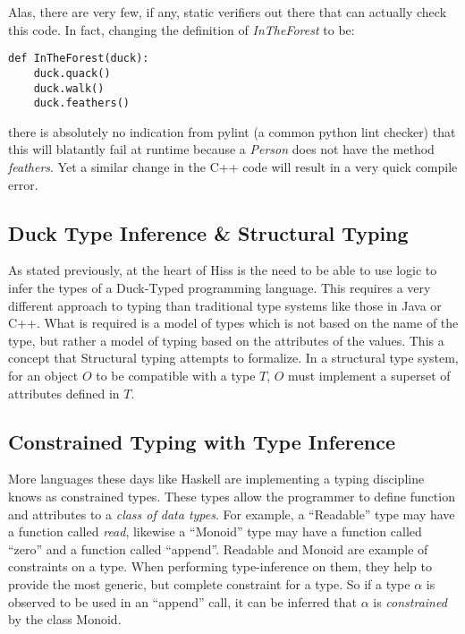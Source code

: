 \documentclass{article}
\begin{document}
\begin{multicols}{2}
\inputminted{python}{test1.py}

Alas, there are very few, if any, static verifiers out there that can actually
check this code. In fact, changing the definition of \emph{InTheForest}
to be:

\begin{verbatim}
def InTheForest(duck):
    duck.quack()
    duck.walk()
    duck.feathers()
\end{verbatim}

there is absolutely no indication from pylint (a common python lint checker) that
this will blatantly fail at runtime because a \emph{Person} does not have the
method \emph{feathers}. Yet a similar change in the C++ code will result in a
very quick compile error.

\subsection*{Duck Type Inference \& Structural Typing}

As stated previously, at the heart of Hiss is the need to be able to use logic
to infer the types of a Duck-Typed programming language. This requires a very
different approach to typing than traditional type systems like those in Java
or C++. What is required is a model of types which is not based on the name of
the type, but rather a model of typing based on the attributes of the values.
This a concept that Structural typing attempts to formalize. In a structural
type system, for an object $O$ to be compatible with a type $T$, $O$ must implement
a superset of attributes defined in $T$.\cite{nst}

\subsection*{Constrained Typing with Type Inference}

More languages these days like Haskell are implementing a typing discipline
knows as constrained types. These types allow the programmer to define function
and attributes to a \emph{class of data types}. For example, a ``Readable'' type
may have a function called \emph{read}, likewise a ``Monoid'' type may have a
function called ``zero'' and a function called ``append''. Readable and Monoid are
example of constraints on a type. When performing type-inference on them, they
help to provide the most generic, but complete constraint for a type. So if a
type $\alpha$ is observed to be used in an ``append'' call, it can be inferred
that $\alpha$ is \emph{constrained} by the class Monoid.


\end{multicols}
\end{document}
